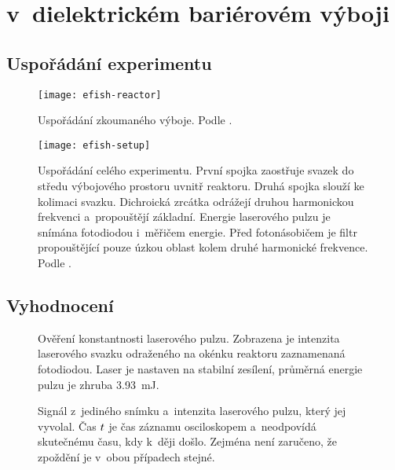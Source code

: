\chapter[\EFISH]{{\EFISH} v~dielektrickém bariérovém výboji}

\newcommand\ypos{y}

\section{Uspořádání experimentu}
\label{sec:efish-setup}

\begin{figure}
	\texttt{[image: efish-reactor]}
	\caption{Uspořádání zkoumaného výboje. Podle \cite{efish-nitrogen}.}
\end{figure}

\begin{figure}
	\texttt{[image: efish-setup]}
	\caption{Uspořádání celého experimentu.
	První spojka zaostřuje svazek do středu výbojového prostoru
	uvnitř reaktoru.
	Druhá spojka slouží ke kolimaci svazku.
	Dichroická zrcátka odrážejí druhou harmonickou frekvenci
	a~propouštějí základní.
	Energie laserového pulzu je snímána fotodiodou i~měřičem energie.
	Před fotonásobičem je filtr propouštějící pouze úzkou oblast
	kolem druhé harmonické frekvence.
	Podle \cite{efish-nitrogen}.}
\end{figure}

\section{Vyhodnocení}
\label{sec:efish-method}

\begin{figure}[htp]
	\centering
	
	\caption{Ověření konstantnosti laserového pulzu.
		Zobrazena je intenzita laserového svazku odraženého
		na okénku reaktoru zaznamenaná fotodiodou.
		Laser je nastaven na stabilní zesílení,
		průměrná energie pulzu je zhruba \SI{3.93}{\milli\joule}.}
	\label{fig:efish-pulse-compare}
\end{figure}

\begin{figure}[htp]
	\centering
	
	\caption{Signál \EFISH{} z~jediného snímku
		a~intenzita laserového pulzu, který jej vyvolal.
		Čas $t$ je čas záznamu osciloskopem a~neodpovídá skutečnému času,
		kdy k~ději došlo.
		Zejména není zaručeno, že zpoždění je v~obou případech stejné.}
	\label{fig:efish-singleshot}
\end{figure}

